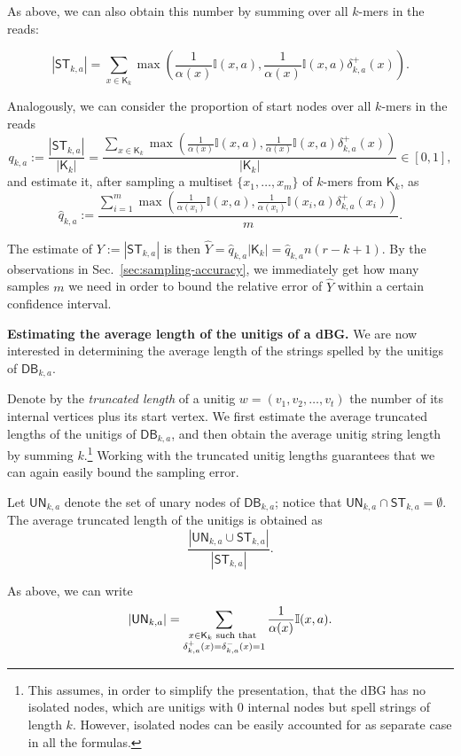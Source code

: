 \documentclass[a4paper,11pt]{article}
\newcommand{\alex}[1]{{\color{blue}{#1}}}
\newcommand{\DB}{\mathsf{DB}_{k,a}}
\newcommand{\ST}{\mathsf{ST}_{k,a}}
\newcommand{\UN}{\mathsf{UN}_{k,a}}
\newcommand{\dplus}{\delta^+_{k,a}}
\newcommand{\dminus}{\delta^-_{k,a}}
\newcommand{\K}{\mathsf{K}}
\newcommand{\abu}{\alpha}
\begin{document}
As above, we can also obtain this number by summing over all $k$-mers in the reads:

\[|\ST| = \sum_{x \in \K_k} \max\left(\frac{1}{\abu(x)}\mathbb{I}(x,a),\frac{1}{\abu(x)}\mathbb{I}(x,a)\dplus(x)\right).\]

Analogously, we can consider the proportion of start nodes over all $k$-mers in the reads
\[q_{k,a} := \frac{|\ST|}{|\K_k|} = \frac{\sum_{x \in \K_k} \max\left(\frac{1}{\abu(x)}\mathbb{I}(x,a),\frac{1}{\abu(x)}\mathbb{I}(x,a)\dplus(x)\right)}{|\K_k|} \in [0,1],\]
and estimate it, after sampling a multiset $\{x_1,\dots,x_m\}$ of $k$-mers from $\K_k$, as
\[\hat{q}_{k,a} := \frac{\sum_{i = 1}^{m} \max\left(\frac{1}{\abu(x_i)}\mathbb{I}(x,a),\frac{1}{\abu(x_i)}\mathbb{I}(x_i,a)\dplus(x_i)\right)}{m}.\]

The estimate of $Y := |\ST|$ is then $\hat{Y} = \hat{q}_{k,a}|\K_k| = \hat{q}_{k,a}n(r-k+1)$. By the observations in Sec.~\ref{sec:sampling-accuracy}, we immediately get how many samples $m$ we need in order to bound the relative error of $\hat{Y}$ within a certain confidence interval.
\alex{say we can implement this for all abundances.}

\medskip
\noindent\textbf{Estimating the average length of the unitigs of a dBG.} We are now interested in determining the average length of the strings spelled by the unitigs of $\DB$. 

Denote by the \emph{truncated length} of a unitig $w = (v_1,v_2,\dots,v_t)$ the number of its internal vertices plus its start vertex. We first estimate the average truncated lengths of the unitigs of $\DB$, and then obtain the average unitig string length by summing $k$.\footnote{This assumes, in order to simplify the presentation, that the dBG has no isolated nodes, which are unitigs with $0$ internal nodes but spell strings of length $k$. However, isolated nodes can be easily accounted for as separate case in all the formulas.} Working with the truncated unitig lengths guarantees that we can again easily bound the sampling error.

Let $\UN$ denote the set of unary nodes of $\DB$; notice that $\UN \cap \ST = \emptyset$. The average truncated length of the unitigs is obtained as 
\begin{equation}
\frac{|\UN \cup \ST|}{|\ST|}.
\label{eqn:avg_internal}
\end{equation}

As above, we can write
\[|\UN| = \sum_{\begin{subarray}{c} x \in \K_k \text{ such that } \\ \dplus(x) = \dminus(x) = 1 \end{subarray}} \frac{1}{\abu(x)}\mathbb{I}(x,a).\]
\end{document}

